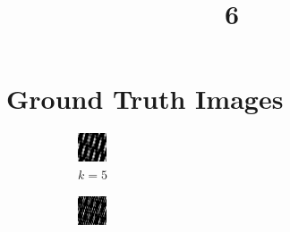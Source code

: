 \documentclass[a4paper, landscape]{article}
\title{6}
\date{}
\begin{document}
\maketitle
\section{Ground Truth Images}
\begin{figure}[H]
    \centering
    \begin{subfigure}{0.09\linewidth}
        \centering
        \includegraphics[width=\linewidth]{k = 5.png}
        \caption{$k = 5$}
    \end{subfigure}
    \begin{subfigure}{0.09\linewidth}
        \centering
        \includegraphics[width=\linewidth]{k = 10.png}

\end{subfigure}
\end{figure}
\end{document}
